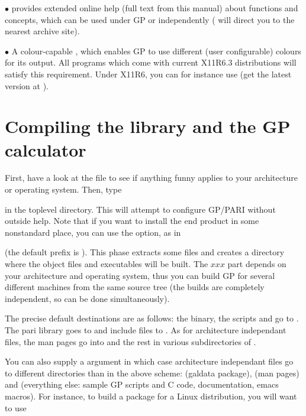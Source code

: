   $\bullet$  provides extended online help (full text from this
manual) about functions and concepts, which can be used under GP or
independently ( will direct you to the nearest
 archive site).

  $\bullet$ A colour-capable , which enables GP to use different
(user configurable) colours for its output. All  programs which come
with current X11R6.3 distributions will satisfy this requirement. Under X11R6,
you can for instance use  (get the latest version at
).

\vfill\eject
\section{Compiling the library and the GP calculator}

 First, have a look at the  file
to see if anything funny applies to your architecture or operating system.
Then, type 


\noindent in the toplevel directory. This will attempt to configure GP/PARI
without outside help. Note that if you want to install the end product in
some nonstandard place, you can use the  option, as in


\noindent (the default prefix is ). This phase extracts some
files and creates a directory  where the object files and
executables will be built. The $xxx$ part depends on your architecture and
operating system, thus you can build GP for several different machines from
the same source tree (the builds are completely independent, so can be done
simultaneously).

 The precise default destinations are as follows:
the  binary, the scripts  and  go to
. The pari library goes to  and include
files to . As for architecture independant files,
the man pages go into  and the rest in various
subdirectories of .

\noindent You can also supply a  argument in which case
architecture independant files go to different directories than in the above
scheme:  (galdata package),  (man pages)
and  (everything else: sample GP scripts and C code,
documentation, emacs macros). For instance, to build a package for a Linux
distribution, you will want to use


